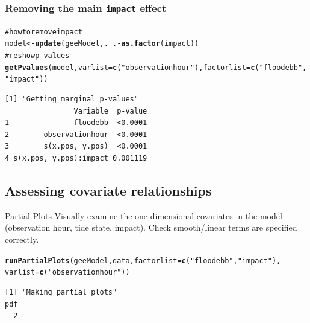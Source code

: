 \documentclass[11pt, a4paper]{article}
\makeatletter
\newcommand{\hlfunctioncall}[1]{\textcolor[rgb]{0.501960784313725,0,0.329411764705882}{\textbf{#1}}}%
\newcommand{\hlstring}[1]{\textcolor[rgb]{0.6,0.6,1}{#1}}%
\newcommand{\hlcomment}[1]{\textcolor[rgb]{0.180392156862745,0.6,0.341176470588235}{#1}}%
\newenvironment{kframe}{%
 \def\at@end@of@kframe{}%
 \ifinner\ifhmode%
  \def\at@end@of@kframe{\end{minipage}}%
  \begin{minipage}{\columnwidth}%
 \fi\fi%
 \def\FrameCommand##1{\hskip\@totalleftmargin \hskip-\fboxsep
 \colorbox{shadecolor}{##1}\hskip-\fboxsep
     \hskip-\linewidth \hskip-\@totalleftmargin \hskip\columnwidth}%
 \MakeFramed {\advance\hsize-\width
   \@totalleftmargin\z@ \linewidth\hsize
   \@setminipage}}%
 {\par\unskip\endMakeFramed%
 \at@end@of@kframe}
\newenvironment{knitrout}{}{} %
\makeatother
\begin{document}
\begin{frame}[fragile]
\frametitle{Removing the main {\tt impact} effect}
\begin{knitrout}\footnotesize
{}\color{fgcolor}\begin{kframe}
\begin{alltt}
\hlcomment{# how to remove impact}
model <- \hlfunctioncall{update}(geeModel, . ~ . - \hlfunctioncall{as.factor}(impact))
\hlcomment{# reshow p-values}
\hlfunctioncall{getPvalues}(model, varlist = \hlfunctioncall{c}(\hlstring{"observationhour"}), factorlist = \hlfunctioncall{c}(\hlstring{"floodebb"}, 
    \hlstring{"impact"}))
\end{alltt}
\begin{verbatim}
[1] "Getting marginal p-values"
                Variable  p-value
1               floodebb  <0.0001
2        observationhour  <0.0001
3        s(x.pos, y.pos)  <0.0001
4 s(x.pos, y.pos):impact 0.001119
\end{verbatim}
\end{kframe}
\end{knitrout}

\end{frame}


\clearpage
\subsection{Assessing covariate relationships}

\begin{frame}[fragile]
\begin{block}{Partial Plots}
Visually examine the one-dimensional covariates in the model (observation hour, tide state, impact).
Check smooth/linear terms are specified correctly.
\end{block}

\begin{knitrout}\footnotesize
{}\color{fgcolor}\begin{kframe}
\begin{alltt}
\hlfunctioncall{runPartialPlots}(geeModel, data, factorlist = \hlfunctioncall{c}(\hlstring{"floodebb"}, \hlstring{"impact"}), 
    varlist = \hlfunctioncall{c}(\hlstring{"observationhour"}))
\end{alltt}
\begin{verbatim}
[1] "Making partial plots"
pdf 
  2 
\end{verbatim}
\end{kframe}
\end{knitrout}

\end{frame}
\end{document}
